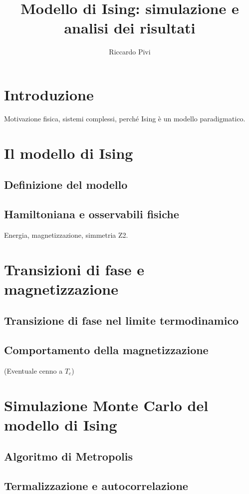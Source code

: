 

\title{Modello di Ising: simulazione e analisi dei risultati}
\author{Riccardo Pivi}
\maketitle
\tableofcontents

\section{Introduzione}
Motivazione fisica, sistemi complessi, perché Ising è un modello paradigmatico.

\section{Il modello di Ising}
\subsection{Definizione del modello}
\subsection{Hamiltoniana e osservabili fisiche}
Energia, magnetizzazione, simmetria Z2.

\section{Transizioni di fase e magnetizzazione}
\subsection{Transizione di fase nel limite termodinamico}
\subsection{Comportamento della magnetizzazione}
(Eventuale cenno a $T_c$)

\section{Simulazione Monte Carlo del modello di Ising}
\subsection{Algoritmo di Metropolis}
\subsection{Termalizzazione e autocorrelazione}
